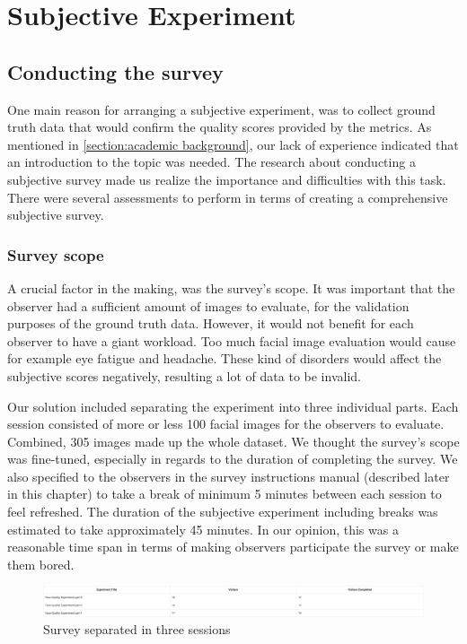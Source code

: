\chapter{Subjective Experiment}
\label{chap:subjective}

\section{Conducting the survey}
\label{sec:ConductingSurvey}
One main reason for arranging a subjective experiment, was to collect ground truth data that would confirm the quality scores provided by the metrics. As mentioned in \ref{section:academic background}, our lack of experience indicated that an introduction to the topic was needed. The research about conducting a subjective survey made us realize the importance and difficulties with this task. There were several assessments to perform in terms of creating a comprehensive subjective survey.

\subsection*{Survey scope}
A crucial factor in the making, was the survey's scope. It was important that the observer had a sufficient amount of images to evaluate, for the validation purposes of the ground truth data. However, it would not benefit for each observer to have a giant workload. Too much facial image evaluation would cause for example eye fatigue and headache. These kind of disorders would affect the subjective scores negatively, resulting a lot of data to be invalid. 

Our solution included separating the experiment into three individual parts. Each session consisted of more or less 100 facial images for the observers to evaluate. Combined, 305 images made up the whole dataset. We thought the survey's scope was fine-tuned, especially in regards to the duration of completing the survey. We also specified to the observers in the survey instructions manual (described later in this chapter) to take a break of minimum 5 minutes between each session to feel refreshed. The duration of the subjective experiment including breaks was estimated to take approximately 45 minutes. In our opinion, this was a reasonable time span in terms of making observers participate the survey or make them bored. 

\begin{figure}[h]
    \centering
    \includegraphics[scale = 0.2]{figures/three-sessions.png}
    \caption{Survey separated in three sessions}
    \label{fig:three-sessions}
\end{figure}

